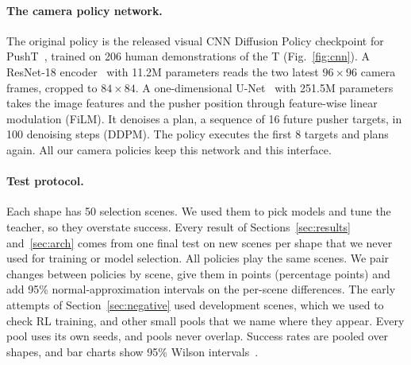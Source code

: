 \documentclass[10pt,twocolumn,letterpaper]{article}
\begin{document}
\paragraph{The camera policy network.}
The original policy is the released visual CNN Diffusion Policy checkpoint for PushT~\citep{chi2023diffusion}, trained
on 206 human demonstrations of the T (Fig.~\ref{fig:cnn}). A ResNet-18 encoder~\citep{he2016resnet} with 11.2M
parameters reads the two latest $96\times96$ camera frames, cropped to $84\times84$. A one-dimensional
U-Net~\citep{ronneberger2015unet} with 251.5M parameters takes the image features and the pusher position through
feature-wise linear modulation (FiLM). It denoises a plan, a sequence of 16 future pusher targets, in 100 denoising
steps (DDPM). The policy executes the first 8 targets and plans again. All our camera policies keep this network and
this interface.

\paragraph{Test protocol.}
Each shape has 50 selection scenes. We used them to pick models and tune the teacher, so they overstate success. Every
result of Sections~\ref{sec:results} and~\ref{sec:arch} comes from one final test on \numTestScenes{} new scenes per
shape that we never used for training or model selection. All policies play the same scenes. We pair changes between
policies by scene, give them in points (percentage points) and add 95\% normal-approximation intervals on the
per-scene differences. The early attempts of Section~\ref{sec:negative} used development scenes, which we used to
check RL training, and other small pools that we name where they appear. Every pool uses its own seeds, and pools never
overlap. Success rates are pooled over shapes, and bar charts show 95\% Wilson intervals~\citep{wilson1927probable}.
\end{document}
